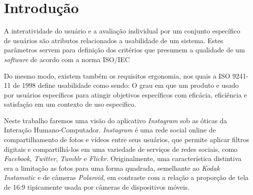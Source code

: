 \documentclass[
	12pt,				%
	openright,			%
	oneside,			%
	a4paper,			%
	english,			%
	french,				%
	spanish,			%
	brazil,				%
	]{abntex2}
\begin{document}

\frenchspacing 


\imprimircapa

\imprimirfolhaderosto


\listoffigures*
\cleardoublepage

\listoftables*
\cleardoublepage


\tableofcontents*
\cleardoublepage


\textual

\chapter*[Introdução]{Introdução}

A interatividade do usuário e a avaliação individual por um conjunto específico de usuários  são atributos relacionados a usabilidade de um sistema. Estes parâmetros servem para definição dos critérios que presumem a qualidade de um \textit{software} de acordo com a norma ISO/IEC

Do mesmo modo, existem também os requisitos ergonomia, nos quais a ISO 9241-11 de 1998 define usabilidade como sendo: O grau em que um produto e usado por usuários específicos para atingir objetivos específicos com eficácia, eficiência e satisfação em um contexto de uso especifico.

Neste trabalho faremos uma visão do aplicativo \textit{Instagram} sob as óticas da Interação Humano-Computador. \textit{Instagram} é uma rede social online de compartilhamento de fotos e vídeos entre seus usuários, que permite aplicar filtros digitais e compartilhá-los em uma variedade de serviços de redes sociais, como \textit{Facebook}, \textit{Twitter}, \textit{Tumblr} e \textit{Flickr}. Originalmente, uma característica distintiva era a limitação as fotos para uma forma quadrada, semelhante ao \textit{Kodak Instamatic} e de câmeras \textit{Polaroid}, em contraste com a relação a proporção de tela de 16:9 tipicamente usada por câmeras de dispositivos móveis.
\end{document}
